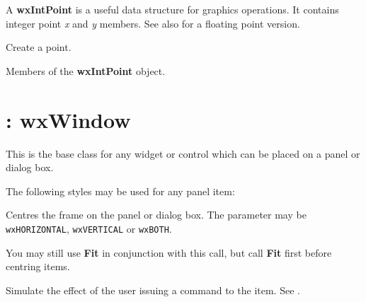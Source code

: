 A {\bf wxIntPoint} is a useful data structure for graphics operations.
It contains integer point {\it x} and {\it y} members.
See also  for a floating point version.




Create a point.



Members of the {\bf wxIntPoint} object.

\section{: wxWindow}\label{wxitem}

This is the base class for any widget or control which can be placed on a panel
or dialog box.

The following styles may be used for any panel item:

\begin{twocollist}\itemsep=0pt
\end{twocollist}



Centres the frame on the panel or dialog box. The parameter may be {\tt
wxHORIZONTAL}, {\tt wxVERTICAL} or {\tt wxBOTH}.

You may still use {\bf Fit} in conjunction with this call, but call {\bf Fit}\rtfsp
first before centring items.



Simulate the effect of the user issuing a command to the item. See .



